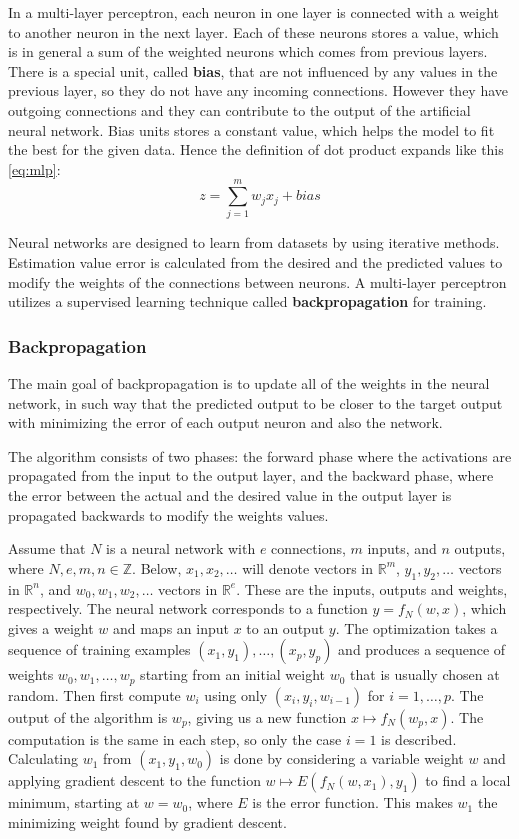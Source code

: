 In a multi-layer perceptron, each neuron in one layer is connected with a weight to another neuron in the next layer. Each of these neurons stores a value, which is in general a sum of the weighted neurons which comes from previous layers. There is a special unit, called \textbf{bias}, that are not influenced by any values in the previous layer, so they do not have any incoming connections. However they have outgoing connections and they can contribute to the output of the artificial neural network. Bias units stores a constant value, which helps the model to fit the best for the given data. Hence the definition of dot product expands like this \eqref{eq:mlp}:
\begin{equation} z = \sum_{j=1}^m w_j x_j + bias \label{eq:mlp} \end{equation}

Neural networks are designed to learn from datasets by using iterative methods. Estimation value error is calculated from the desired and the predicted values to modify the weights of the connections between neurons. A multi-layer perceptron utilizes a supervised learning technique called \textbf{backpropagation} for training.


\subsubsection{Backpropagation}

The main goal of backpropagation \cite{chauvin2013backpropagation} is to update all of the weights in the neural network, in such way that the predicted output to be closer to the target output with minimizing the error of each output neuron and also the network.

The algorithm consists of two phases: the forward phase where the activations are propagated from the input to the output layer, and the backward phase, where the error between the actual and the desired value in the output layer is propagated backwards to modify the weights values. \medskip

Assume that $N$ is a neural network with $e$ connections, $m$ inputs, and $n$ outputs, where $N,e,m,n\in\mathbb{Z}$. Below, $x_{1},x_{2},\dots$ will denote vectors in $\mathbb{R}^m$, $y_1,y_2,\dots$ vectors in $\mathbb{R}^n$, and $w_0,w_1,w_2,\dots$ vectors in $\mathbb{R}^e$. These are the inputs, outputs and weights, respectively. The neural network corresponds to a function $y=f_N(w,x)$, which gives a weight $w$ and maps an input $x$ to an output $y$. The optimization takes a sequence of training examples $(x_1,y_1),\dots ,(x_p,y_p)$ and produces a sequence of weights $w_0,w_1,\dots ,w_p$ starting from an initial weight $w_0$ that is usually chosen at random. Then first compute $w_i$ using only $(x_i,y_i,w_{i-1})$ for $i=1,\dots ,p$. The output of the algorithm is $w_p$, giving us a new function $x \mapsto f_N(w_p,x)$. The computation is the same in each step, so only the case $i=1$ is described. Calculating $w_1$ from $(x_1,y_1,w_0)$ is done by considering a variable weight $w$ and applying gradient descent to the function $w \mapsto E(f_N(w,x_1),y_1)$ to find a local minimum, starting at $w=w_0$, where $E$ is the error function. This makes $w_1$ the minimizing weight found by gradient descent.\medskip

